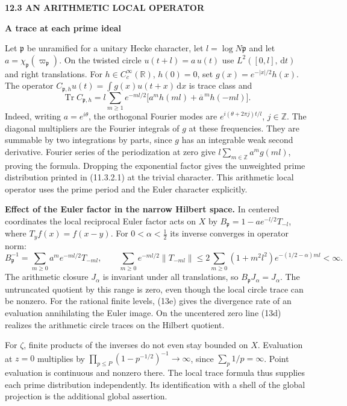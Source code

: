 \documentclass[11pt,letterpaper]{article}
\newcommand{\rightmarktext}{}
\newcommand{\printfolio}{}
\newcommand{\leaf}[4]{\clearpage\gdef\printfolio{#1}\gdef\rightmarktext{#2}%
  {\small\sffamily\bfseries\color{ink}#3\par}\vspace{3pt}%
  {\LARGE\bfseries #4\par}\vspace{5pt}}
\newcommand{\point}[1]{\par\smallskip\textbf{#1.}\enspace\ignorespaces}
\newcommand{\R}{\mathbb R}
\newcommand{\Z}{\mathbb Z}
\newcommand{\dd}{\,\mathrm d}
\DeclareMathOperator{\Tr}{Tr}
\begin{document}
\leaf{514b}{The individual prime terms}{12.3 \quad AN ARITHMETIC LOCAL OPERATOR}{A trace at each prime ideal}
Let $\mathfrak p$ be unramified for a unitary Hecke character, let
$l=\log N\mathfrak p$ and let $a=\chi_{\mathfrak p}(\varpi_{\mathfrak p})$.
On the twisted circle $u(t+l)=a\,u(t)$ use $L^2([0,l],\dd t)$ and right
translations. For $h\in C_c^\infty(\R)$, $h(0)=0$, set
$g(x)=e^{-|x|/2}h(x)$. The operator
$C_{\mathfrak p,h}u(t)=\int g(x)u(t+x)\dd x$ is trace class and
\[
 \Tr C_{\mathfrak p,h}
  = l\sum_{m\ge1} e^{-ml/2}
      \big[a^m h(ml)+\overline a^{\,m}h(-ml)\big].
\]
Indeed, writing $a=e^{i\theta}$, the orthogonal Fourier modes are
$e^{i(\theta+2\pi j)t/l}$, $j\in\Z$. The diagonal multipliers are the
Fourier integrals of $g$ at these frequencies. They are summable by two
integrations by parts, since $g$ has an integrable weak second derivative.
Fourier series of the periodization at zero give
$l\sum_{m\in\Z}a^m g(ml)$, proving the formula. Dropping the exponential
factor gives the unweighted prime distribution printed in (11.3.2.1)
at the trivial character. This arithmetic local operator uses the prime
period and the Euler character explicitly.

\point{Effect of the Euler factor in the narrow Hilbert space}
In centered coordinates the local reciprocal Euler factor acts on $X$
by $B_{\mathfrak p}=1-a e^{-l/2}T_{-l}$, where $T_yf(x)=f(x-y)$.
For $0<\alpha<\tfrac12$ its inverse converges in operator norm:
\[
 B_{\mathfrak p}^{-1}
       =\sum_{m\ge0}a^m e^{-ml/2}T_{-ml},\qquad
 \sum_{m\ge0}e^{-ml/2}\|T_{-ml}\|
       \le 2\sum_{m\ge0}(1+m^2l^2)e^{-(1/2-\alpha)ml}<\infty .
\]
The arithmetic closure $J_\alpha$ is invariant under all translations,
so $B_{\mathfrak p}J_\alpha=J_\alpha$. The untruncated quotient by
this range is zero, even though the local circle trace can be nonzero.
For the rational finite levels, (13e) gives the divergence rate of an
evaluation annihilating the Euler image. On the uncentered zero line
(13d) realizes the arithmetic circle traces on the Hilbert quotient.

For $\zeta$, finite products of the inverses do not even stay bounded on
$X$. Evaluation at $z=0$ multiplies by
$\prod_{p\le P}(1-p^{-1/2})^{-1}\to\infty$, since $\sum_p1/p=\infty$.
Point evaluation is continuous and nonzero there. The local trace formula
thus supplies each prime distribution independently. Its identification
with a shell of the global projection is the additional global assertion.
\end{document}
